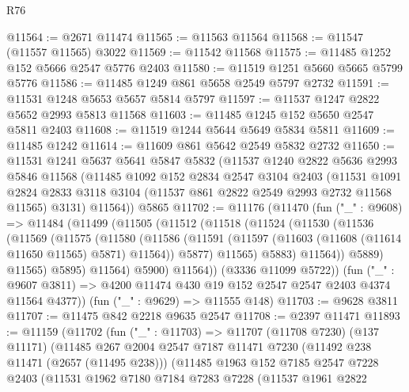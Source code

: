 \begin{lexlean}{R76}
\begin{coremodule}
@11564 := @2671 @11474
@11565 := @11563 @11564
@11568 := @11547 (@11557 @11565) @3022
@11569 := @11542 @11568
@11575 := @11485 @1252 @152 @5666 @2547 @5776 @2403
@11580 := @11519 @1251 @5660 @5665 @5799 @5776
@11586 := @11485 @1249 @861 @5658 @2549 @5797 @2732
@11591 := @11531 @1248 @5653 @5657 @5814 @5797
@11597 := @11537 @1247 @2822 @5652 @2993 @5813 @11568
@11603 := @11485 @1245 @152 @5650 @2547 @5811 @2403
@11608 := @11519 @1244 @5644 @5649 @5834 @5811
@11609 := @11485 @1242
@11614 := @11609 @861 @5642 @2549 @5832 @2732
@11650 := @11531
    @1241
    @5637
    @5641
    @5847
    @5832
    (@11537
      @1240
      @2822
      @5636
      @2993
      @5846
      @11568
      (@11485
        @1092
        @152
        @2834
        @2547
        @3104
        @2403
        (@11531
          @1091
          @2824
          @2833
          @3118
          @3104
          (@11537 @861 @2822 @2549 @2993 @2732 @11568 @11565)
          @3131)
        @11564))
    @5865
@11702 := @11176
    (@11470
      (fun ("_" : @9608) =>
      @11484
        (@11499
          (@11505
            (@11512
              (@11518
                (@11524
                  (@11530
                    (@11536
                      (@11569
                        (@11575
                          (@11580
                            (@11586
                              (@11591
                                (@11597 (@11603 (@11608 (@11614 @11650 @11565) @5871) @11564))
                                @5877)
                              @11565)
                            @5883)
                          @11564))
                      @5889)
                    @11565)
                  @5895)
                @11564)
              @5900)
            @11564))
        (@3336 @11099 @5722))
      (fun ("_" : @9607 @3811) => @4200 @11474 @430 @19 @152 @2547 @2547 @2403 @4374 @11564 @4377))
    (fun ("_" : @9629) => @11555 @148)
@11703 := @9628 @3811
@11707 := @11475 @842 @2218 @9635 @2547
@11708 := @2397 @11471
@11893 := @11159
    (@11702
      (fun ("_" : @11703) =>
      @11707
        (@11708 @7230)
        (@137 @11171)
        (@11485
          @267
          @2004
          @2547
          @7187
          @11471
          @7230
          (@11492 @238 @11471 (@2657 (@11495 @238)))
          (@11485
            @1963
            @152
            @7185
            @2547
            @7228
            @2403
            (@11531
              @1962
              @7180
              @7184
              @7283
              @7228
              (@11537
                @1961
                @2822

\end{coremodule}
\end{lexlean}
